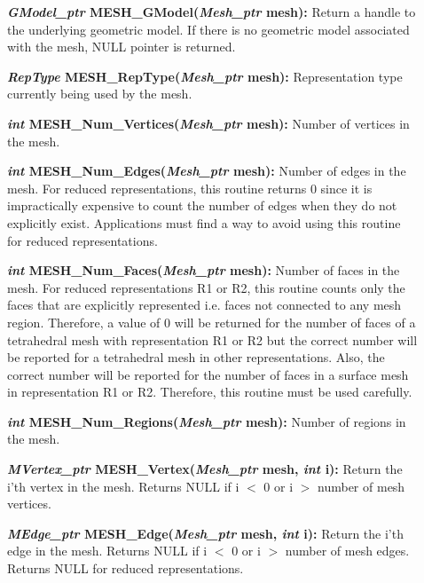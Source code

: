 \documentclass[12pt]{article}
\begin{document}
\begin{description}
\item[]

\item[]\textbf{\textit{GModel\_ptr} MESH\_GModel(\textit{Mesh\_ptr} mesh):}
Return a handle to the underlying geometric model. If there is no
geometric model associated with the mesh, NULL pointer is returned.

\item[]\textbf{\textit{RepType} MESH\_RepType(\textit{Mesh\_ptr} mesh):}
Representation type currently being used by the mesh.

\item[]

\item[]\textbf{\textit{int} MESH\_Num\_Vertices(\textit{Mesh\_ptr} mesh):}
Number of vertices in the mesh.

\item[]\textbf{\textit{int} MESH\_Num\_Edges(\textit{Mesh\_ptr} mesh):}
Number of edges in the mesh. For reduced representations, this routine
returns 0 since it is impractically expensive to count the number of
edges when they do not explicitly exist. Applications must find a way
to avoid using this routine for reduced representations.

\item[]\textbf{\textit{int} MESH\_Num\_Faces(\textit{Mesh\_ptr} mesh):}
Number of faces in the mesh. For reduced representations R1 or R2,
this routine counts only the faces that are explicitly represented
i.e. faces not connected to any mesh region. Therefore, a value of 0
will be returned for the number of faces of a tetrahedral mesh with
representation R1 or R2 but the correct number will be reported for a
tetrahedral mesh in other representations. Also, the correct number
will be reported for the number of faces in a surface mesh in
representation R1 or R2.  Therefore, this routine must be used
carefully.


\item[]\textbf{\textit{int} MESH\_Num\_Regions(\textit{Mesh\_ptr} mesh):}
Number of regions in the mesh.

\item[]

\item[]\textbf{\textit{MVertex\_ptr} MESH\_Vertex(\textit{Mesh\_ptr} mesh,
\textit{int} i):} Return the i'th vertex in the mesh. Returns NULL if i
$<$ 0 or i $>$ number of mesh vertices.

\item[]\textbf{\textit{MEdge\_ptr} MESH\_Edge(\textit{Mesh\_ptr} mesh,
\textit{int} i):} Return the i'th edge in the mesh. Returns NULL if i $<$
0 or i $>$ number of mesh edges. Returns NULL for reduced
representations.


\end{description}
\end{document}

